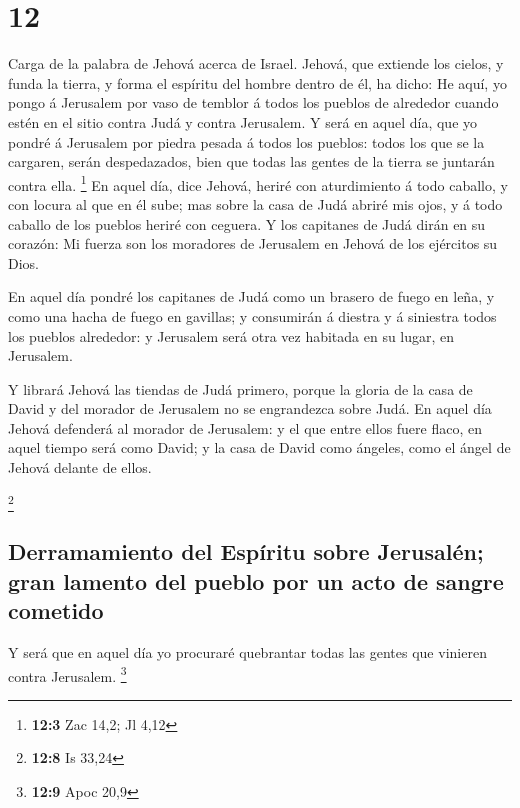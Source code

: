 \hypertarget{section-11}{%
\section{12}\label{section-11}}

 Carga de la palabra de Jehová acerca de Israel. Jehová, que
extiende los cielos, y funda la tierra, y forma el espíritu del hombre
dentro de él, ha dicho:  He aquí, yo pongo á Jerusalem por
vaso de temblor á todos los pueblos de alrededor cuando estén en el
sitio contra Judá y contra Jerusalem.  Y será en aquel día,
que yo pondré á Jerusalem por piedra pesada á todos los pueblos: todos
los que se la cargaren, serán despedazados, bien que todas las gentes de
la tierra se juntarán contra ella. \footnote{\textbf{12:3} Zac 14,2; Jl
  4,12}  En aquel día, dice Jehová, heriré con aturdimiento
á todo caballo, y con locura al que en él sube; mas sobre la casa de
Judá abriré mis ojos, y á todo caballo de los pueblos heriré con
ceguera.  Y los capitanes de Judá dirán en su corazón: Mi
fuerza son los moradores de Jerusalem en Jehová de los ejércitos su
Dios.

 En aquel día pondré los capitanes de Judá como un brasero
de fuego en leña, y como una hacha de fuego en gavillas; y consumirán á
diestra y á siniestra todos los pueblos alrededor: y Jerusalem será otra
vez habitada en su lugar, en Jerusalem.

 Y librará Jehová las tiendas de Judá primero, porque la
gloria de la casa de David y del morador de Jerusalem no se engrandezca
sobre Judá.  En aquel día Jehová defenderá al morador de
Jerusalem: y el que entre ellos fuere flaco, en aquel tiempo será como
David; y la casa de David como ángeles, como el ángel de Jehová delante
de ellos.

\footnote{\textbf{12:8} Is 33,24}

\hypertarget{derramamiento-del-espuxedritu-sobre-jerusaluxe9n-gran-lamento-del-pueblo-por-un-acto-de-sangre-cometido}{%
\subsection{Derramamiento del Espíritu sobre Jerusalén; gran lamento del
pueblo por un acto de sangre
cometido}\label{derramamiento-del-espuxedritu-sobre-jerusaluxe9n-gran-lamento-del-pueblo-por-un-acto-de-sangre-cometido}}

 Y será que en aquel día yo procuraré quebrantar todas las
gentes que vinieren contra Jerusalem. \footnote{\textbf{12:9} Apoc 20,9}

